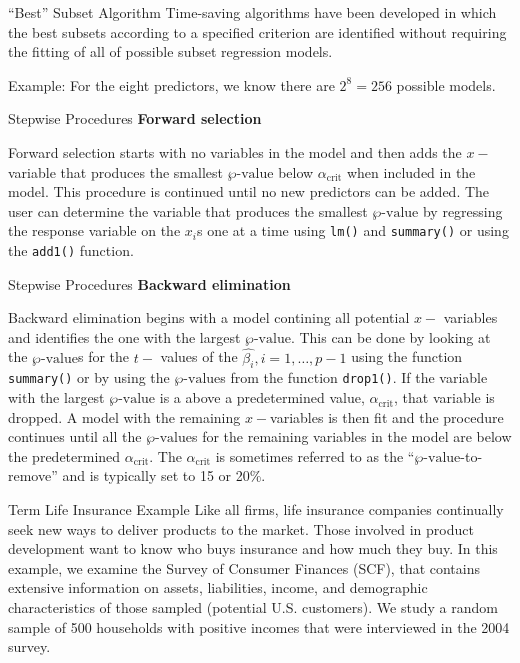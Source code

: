 \documentclass[
  ignorenonframetext,
]{beamer}
\begin{document}
\begin{frame}{``Best'' Subset Algorithm}
\label{best-subset-algorithm}
Time-saving algorithms have been developed in which the best subsets
according to a specified criterion are identified without requiring the
fitting of all of possible subset regression models.

Example: For the eight predictors, we know there are \(2^8=256\)
possible models.
\end{frame}

\begin{frame}[fragile]{Stepwise Procedures}
\label{stepwise-procedures}
\textbf{Forward selection}

Forward selection starts with no variables in the model and then adds
the \(x-\)variable that produces the smallest \(\wp\text{-value}\) below
\(\alpha_{\text{crit}}\) when included in the model. This procedure is
continued until no new predictors can be added. The user can determine
the variable that produces the smallest \(\wp\text{-value}\) by
regressing the response variable on the \(x_i\)s one at a time using
\texttt{lm()} and \texttt{summary()} or using the \texttt{add1()}
function.
\end{frame}

\begin{frame}[fragile]{Stepwise Procedures}
\label{stepwise-procedures-1}
\textbf{Backward elimination}

Backward elimination begins with a model contining all potential \(x-\)
variables and identifies the one with the largest \(\wp\text{-value}\).
This can be done by looking at the \(\wp\text{-value}\)s for the \(t-\)
values of the \(\hat{\beta_i}, i = 1, \ldots,p-1\) using the function
\texttt{summary()} or by using the \(\wp\text{-value}\)s from the
function \texttt{drop1()}. If the variable with the largest
\(\wp\text{-value}\) is a above a predetermined value,
\(\alpha_{\text{crit}}\), that variable is dropped. A model with the
remaining \(x-\)variables is then fit and the procedure continues until
all the \(\wp\text{-value}\)s for the remaining variables in the model
are below the predetermined \(\alpha_{\text{crit}}\). The
\(\alpha_{\text{crit}}\) is sometimes referred to as the
``\(\wp\text{-value}\)-to-remove'' and is typically set to 15 or 20\%.
\end{frame}

\begin{frame}{Term Life Insurance Example}
\label{term-life-insurance-example-4}
Like all firms, life insurance companies continually seek new ways to
deliver products to the market. Those involved in product development
want to know who buys insurance and how much they buy. In this example,
we examine the Survey of Consumer Finances (SCF), that contains
extensive information on assets, liabilities, income, and demographic
characteristics of those sampled (potential U.S. customers). We study a
random sample of 500 households with positive incomes that were
interviewed in the 2004 survey.
\end{frame}
\end{document}
